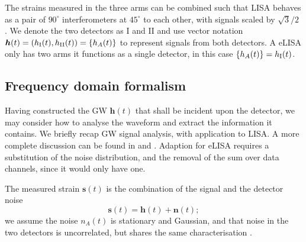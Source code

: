 The strains measured in the three arms can be combined such that LISA behaves as a pair of $90^{\circ}$ interferometers at $45^{\circ}$ to each other, with signals scaled by ${\sqrt{3}}/{2}$ \citep{Cutler1998}. We denote the two detectors as I and II and use vector notation $\boldsymbol{h}(t) = \left(h_\mathrm{I}(t), h_\mathrm{II}(t)\right) = \left\{h_A(t)\right\}$ to represent signals from both detectors. A eLISA only has two arms it functions as a single detector, in this case $\left\{h_A(t)\right\} = h_\mathrm{I}(t)$.

\subsection{Frequency domain formalism}

Having constructed the GW $\boldsymbol{h}(t)$ that shall be incident upon the detector, we may consider how to analyse the waveform and extract the information it contains. We briefly recap GW signal analysis, with application to LISA. A more complete discussion can be found in \citet{Finn1992} and \citet{Cutler1994}. Adaption for eLISA requires a substitution of the noise distribution, and the removal of the sum over data channels, since it would only have one.

The measured strain $\boldsymbol{s}(t)$ is the combination of the signal and the detector noise
\begin{equation}
\boldsymbol{s}(t) = \boldsymbol{h}(t) + \boldsymbol{n}(t);
\end{equation}
we assume the noise $n_A(t)$ is stationary and Gaussian, and that noise in the two detectors is uncorrelated, but shares the same characterisation \citep{Cutler1998}.

